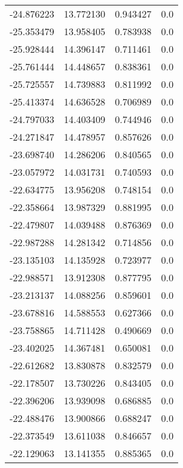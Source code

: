 \begin{tabular}{rrrr}
      -24.876223 &        13.772130 &    0.943427 &   0.0 \\
      -25.353479 &        13.958405 &    0.783938 &   0.0 \\
      -25.928444 &        14.396147 &    0.711461 &   0.0 \\
      -25.761444 &        14.448657 &    0.838361 &   0.0 \\
      -25.725557 &        14.739883 &    0.811992 &   0.0 \\
      -25.413374 &        14.636528 &    0.706989 &   0.0 \\
      -24.797033 &        14.403409 &    0.744946 &   0.0 \\
      -24.271847 &        14.478957 &    0.857626 &   0.0 \\
      -23.698740 &        14.286206 &    0.840565 &   0.0 \\
      -23.057972 &        14.031731 &    0.740593 &   0.0 \\
      -22.634775 &        13.956208 &    0.748154 &   0.0 \\
      -22.358664 &        13.987329 &    0.881995 &   0.0 \\
      -22.479807 &        14.039488 &    0.876369 &   0.0 \\
      -22.987288 &        14.281342 &    0.714856 &   0.0 \\
      -23.135103 &        14.135928 &    0.723977 &   0.0 \\
      -22.988571 &        13.912308 &    0.877795 &   0.0 \\
      -23.213137 &        14.088256 &    0.859601 &   0.0 \\
      -23.678816 &        14.588553 &    0.627366 &   0.0 \\
      -23.758865 &        14.711428 &    0.490669 &   0.0 \\
      -23.402025 &        14.367481 &    0.650081 &   0.0 \\
      -22.612682 &        13.830878 &    0.832579 &   0.0 \\
      -22.178507 &        13.730226 &    0.843405 &   0.0 \\
      -22.396206 &        13.939098 &    0.686885 &   0.0 \\
      -22.488476 &        13.900866 &    0.688247 &   0.0 \\
      -22.373549 &        13.611038 &    0.846657 &   0.0 \\
      -22.129063 &        13.141355 &    0.885365 &   0.0 \\

\end{tabular}
